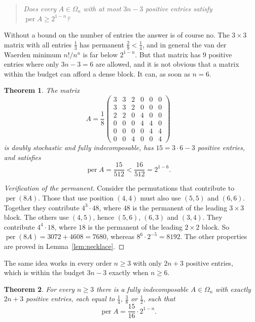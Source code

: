 \documentclass[11pt]{amsart}
\newtheorem{theorem}{Theorem}
\theoremstyle{remark}
\DeclareMathOperator{\per}{per}
\begin{document}
\begin{quote}
\emph{Does every $A\in\Omega_n$ with at most $3n-3$ positive entries satisfy
$\per A\ge2^{1-n}$?}
\end{quote}

Without a bound on the number of entries the answer is of course no. The
$3\times3$ matrix with all entries $\frac13$ has permanent
$\frac29<\frac14$, and in general the van der Waerden minimum $n!/n^n$ is far
below $2^{1-n}$. But that matrix has $9$ positive entries where only
$3n-3=6$ are allowed, and it is not obvious that a matrix within the budget
can afford a dense block. It can, as soon as $n=6$.

\begin{theorem}\label{thm:six}
The matrix
\[
  A=\frac18\begin{pmatrix}
   3&3&2&0&0&0\\
   3&3&2&0&0&0\\
   2&2&0&4&0&0\\
   0&0&0&4&4&0\\
   0&0&0&0&4&4\\
   0&0&4&0&0&4
  \end{pmatrix}
\]
is doubly stochastic and fully indecomposable, has $15=3\cdot6-3$ positive
entries, and satisfies
\[
  \per A=\frac{15}{512}<\frac{16}{512}=2^{1-6}.
\]
\end{theorem}

\begin{proof}[Verification of the permanent]
Consider the permutations that contribute to $\per(8A)$. Those that use
position $(4,4)$ must also use $(5,5)$ and $(6,6)$. Together they contribute
$4^3\cdot48$, where $48$ is the permanent of the leading $3\times3$ block. The
others use $(4,5)$, hence $(5,6)$, $(6,3)$ and $(3,4)$. They contribute
$4^4\cdot18$, where $18$ is the permanent of the leading $2\times2$ block. So
$\per(8A)=3072+4608=7680$, whereas $8^6\cdot2^{-5}=8192$. The other properties
are proved in Lemma~\ref{lem:necklace}.
\end{proof}

The same idea works in every order $n\ge3$ with only $2n+3$ positive entries,
which is within the budget $3n-3$ exactly when $n\ge6$.

\begin{theorem}\label{thm:all}
For every $n\ge3$ there is a fully indecomposable $A\in\Omega_n$ with exactly
$2n+3$ positive entries, each equal to $\frac14$, $\frac38$ or $\frac12$, such
that
\[
  \per A=\frac{15}{16}\cdot2^{1-n}.
\]
\end{theorem}
\end{document}
